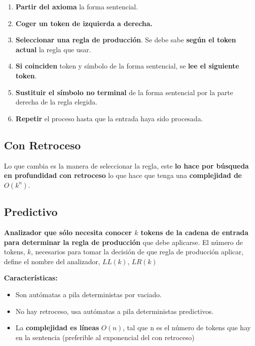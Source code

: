 \documentclass[12pt]{report} %
\begin{document}
\begin{enumerate}
\def\labelenumi{\arabic{enumi}.}

\item
  \textbf{Partir del axioma} la forma sentencial.
\item
  \textbf{Coger un token de izquierda a derecha.}
\item
  \textbf{Seleccionar una regla de producción}. Se debe sabe
  \textbf{según el token actual} la regla que usar.
\item
  \textbf{Si coinciden} token y símbolo de la forma sentencial, se
  \textbf{lee el siguiente token}.
\item
  \textbf{Sustituir el símbolo no terminal} de la forma sentencial por
  la parte derecha de la regla elegida.
\item
  \textbf{Repetir} el proceso hasta que la entrada haya sido procesada.
\end{enumerate}


\subsection{Con Retroceso}

Lo que cambia es la manera de seleccionar la regla, este \textbf{lo hace
por búsqueda en profundidad con retroceso} lo que hace que tenga una
\textbf{complejidad de \(O(k^n)\)}.


\subsection{Predictivo}

\textbf{Analizador que sólo necesita conocer \(k\) tokens de la cadena
de entrada para determinar la regla de producción} que debe aplicarse.
El número de tokens, \(k\), necesarios para tomar la decisión de que
regla de producción aplicar, define el nombre del analizador, \(LL(k)\),
\(LR(k)\)

\textbf{Características:}

\begin{itemize}

\item
  Son autómatas a pila deterministas por vaciado.
\item
  No hay retroceso, usa autómatas a pila deterministas predictivos.
\item
  La \textbf{complejidad es líneas} \(O(n)\), tal que n es el número de
  tokens que hay en la sentencia (preferible al exponencial del con
  retroceso)
\end{itemize}
\end{document}
